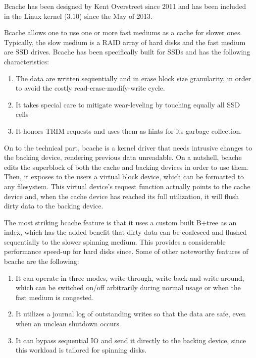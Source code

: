 Bcache has been designed by Kent Overstreet since 2011 and has been included in 
the Linux kernel (3.10) since the May of 2013.

Bcache allows one to use one or more fast mediums as a cache for slower ones.  
Typically, the slow medium is a RAID array of hard disks and the fast medium 
are SSD drives. Bcache has been specifically built for SSDs and has the 
following characteristics:

\begin{enumerate}
	\item The data are written sequentially and in erase block size 
		granularity, in order to avoid the costly read-erase-modify-write 
		cycle.
	\item It takes special care to mitigate wear-leveling by touching equally 
		all SSD cells
	\item It honors TRIM requests and uses them as hints for its garbage 
		collection.
\end{enumerate}

On to the technical part, bcache is a kernel driver that needs intrusive 
changes to the backing device, rendering previous data unreadable. On a 
nutshell, bcache edits the superblock of both the cache and backing devices in 
order to use them. Then, it exposes to the users a virtual block device, which 
can be formatted to any filesystem. This virtual device's request function 
actually points to the cache device and, when the cache device has reached its 
full utilization, it will flush dirty data to the backing device.

The most striking bcache feature is that it uses a custom built B+tree as an 
index, which has the added benefit that dirty data can be coalesced and flushed 
sequentially to the slower spinning medium. This provides a considerable 
performance speed-up for hard disks since. Some of other noteworthy features of 
bcache are the following:

\begin{enumerate}
	\item It can operate in three modes, write-through, write-back and 
		write-around, which can be switched on/off arbitrarily during normal 
		usage or when the fast medium is congested.
	\item It utilizes a journal log of outstanding writes so that the data are 
		safe, even when an unclean shutdown occurs.
	\item It can bypass sequential IO and send it directly to the backing 
		device, since this workload is tailored for spinning disks.
\end{enumerate}

